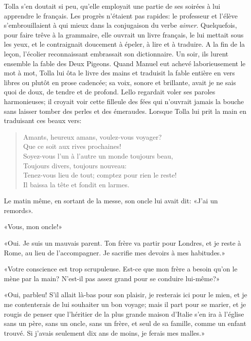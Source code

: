 Tolla s'en doutait si peu, qu'elle employait une partie de ses soirées à
lui apprendre le français. Les progrès n'étaient pas rapides: le
professeur et l'élève s'embrouillaient à qui mieux dans la conjugaison
du verbe \emph{aimer}. Quelquefois, pour faire trêve à la grammaire,
elle ouvrait un livre français, le lui mettait sous les yeux, et le
contraignait doucement à épeler, à lire et à traduire. A la fin de la
leçon, l'écolier reconnaissant embrassait son dictionnaire. Un soir, ils
lurent ensemble la fable des Deux Pigeons. Quand Manuel eut achevé
laborieusement le mot à mot, Tolla lui ôta le livre des mains et
traduisit la fable entière en vers libres ou plutôt en prose cadencée;
sa voix, sonore et brillante, avait je ne sais quoi de doux, de tendre
et de profond. Lello regardait voler ses paroles harmonieuses; il
croyait voir cette filleule des fées qui n'ouvrait jamais la bouche sans
laisser tomber des perles et des émeraudes. Lorsque Tolla lui prit la
main en traduisant ces beaux vers:

\begin{quote}
Amants, heureux amans, voulez-vous voyager?\\
Que ce soit aux rives prochaines!\\
Soyez-vous l’un à l’autre un monde toujours beau,\\
Toujours divers, toujours nouveau:\\
Tenez-vous lieu de tout; comptez pour rien le reste!\\
Il baissa la tête et fondit en larmes.
\end{quote}

Le matin même, en sortant de la messe, son oncle lui avait dit: «J'ai un
remords».

«Vous, mon oncle!»

«Oui. Je suis un mauvais parent. Ton frère va partir pour Londres, et je
reste à Rome, au lieu de l'accompagner. Je sacrifie mes devoirs à mes
habitudes.»

«Votre conscience est trop scrupuleuse. Est-ce que mon frère a besoin
qu'on le mène par la main? N'est-il pas assez grand pour se conduire
lui-même?»

«Oui, parbleu! S'il allait là-bas pour son plaisir, je resterais ici
pour le mien, et je me contenterais de lui souhaiter un bon voyage; mais
il part pour se marier, et je rougis de penser que l'héritier de la plus
grande maison d'Italie s'en ira à l'église sans un père, sans un oncle,
sans un frère, et seul de sa famille, comme un enfant trouvé. Si j'avais
seulement dix ans de moins, je ferais mes malles.»

